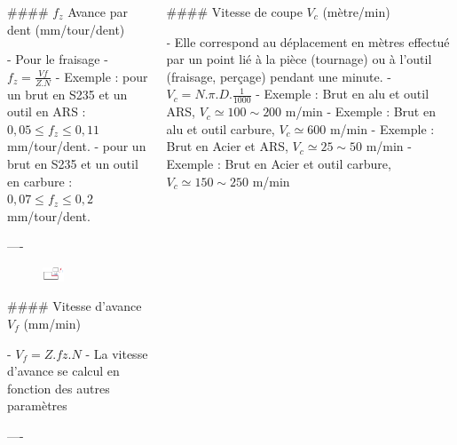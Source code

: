 \documentclass{beamer}
\begin{document}
\begin{frame}[fragile]
\begin{columns}
\begin{column}{.4\textwidth}
\end{column}

\end{columns}

\bigskip

\begin{columns}[T]

\begin{column}{.46\textwidth}

\begin{markdown}

#### $f_z$ Avance par dent (mm/tour/dent)

- Pour le fraisage
- $f_z = \frac{Vf}{Z.N}$
- Exemple : pour un brut en S235 et un outil en ARS : $0,05 \leq f_z \leq 0,11$ mm/tour/dent.
- pour un brut en S235 et un outil en carbure : $0,07 \leq f_z \leq 0,2$ mm/tour/dent.

----

\begin{figure}
\includegraphics[width=0.3\textwidth]{fz1.png}
\end{figure}

#### Vitesse d'avance $V_f$ (mm/min)

- $V_f=Z.fz.N$
- La vitesse d'avance se calcul en fonction des autres paramètres




----


\end{markdown}



\end{column}









\begin{column}{.46\textwidth}

\begin{markdown}

#### Vitesse de coupe $V_c$ (mètre/min)

- Elle correspond au déplacement en mètres effectué par un point lié à la pièce (tournage) ou à l’outil (fraisage, perçage) pendant une minute.
- $V_c=N.\pi .D. \frac{1}{1000}$
- Exemple : Brut en alu et outil ARS, $V_c \simeq 100 \sim 200$ m/min
- Exemple : Brut en alu et outil carbure, $V_c \simeq 600$ m/min
- Exemple : Brut en Acier et ARS, $V_c \simeq 25 \sim 50$ m/min
- Exemple : Brut en Acier et outil carbure, $V_c \simeq 150 \sim 250$ m/min


\end{markdown}
\end{column}
\end{columns}
\end{frame}
\end{document}
